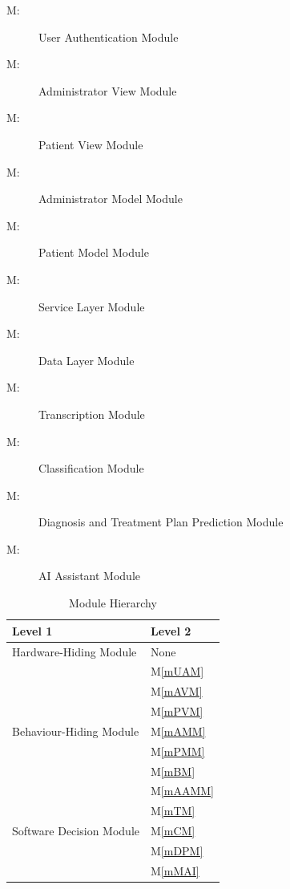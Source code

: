 \documentclass[12pt, titlepage]{article}
\newcounter{mnum}
\newcommand{\mthemnum}{M\themnum}
\newcommand{\mref}[1]{M\ref{#1}}
\begin{document}
\begin{description}
  \item [ \mthemnum \label{mUAM}:] User Authentication Module
  \item [ \mthemnum \label{mAVM}:] Administrator View Module
  \item [ \mthemnum \label{mPVM}:] Patient View Module
  \item [ \mthemnum \label{mAMM}:] Administrator Model Module
  \item [ \mthemnum \label{mPMM}:] Patient Model Module
  \item [ \mthemnum \label{mBM}:] Service Layer Module
  \item [ \mthemnum \label{mAAMM}:] Data Layer Module
  \item [ \mthemnum \label{mTM}:] Transcription Module
  \item [ \mthemnum \label{mCM}:] Classification Module
  \item [ \mthemnum \label{mDPM}:] Diagnosis and Treatment Plan Prediction Module
  \item [ \mthemnum \label{mMAI}:] AI Assistant Module


\end{description}

\begin{table}[h!]
\centering
\begin{tabular}{p{} p{}}
\toprule
\textbf{Level 1} & \textbf{Level 2}\\
\midrule
{Hardware-Hiding Module} & None \\
\midrule
\multirow{7}{0.3\textwidth}{Behaviour-Hiding Module} & \mref{mUAM}\\
& \mref{mAVM}\\
& \mref{mPVM}\\
& \mref{mAMM}\\
& \mref{mPMM}\\
& \mref{mBM}\\
& \mref{mAAMM}\\
\midrule

\multirow{3}{0.3\textwidth}{Software Decision Module} & \mref{mTM}\\
& \mref{mCM}\\
& \mref{mDPM}\\
& \mref{mMAI}\\
\bottomrule

\end{tabular}
\caption{Module Hierarchy}
\label{TblMH}
\end{table}
\end{document}
